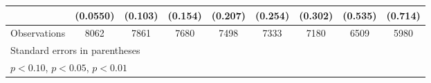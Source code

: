 \begin{table}[htbp]
\begin{tabular}{l*{8}{c}}
                    &    (0.0550)         &     (0.103)         &     (0.154)         &     (0.207)         &     (0.254)         &     (0.302)         &     (0.535)         &     (0.714)         \\
\hline
Observations        &        8062         &        7861         &        7680         &        7498         &        7333         &        7180         &        6509         &        5980         \\
\hline\hline
\multicolumn{9}{l}{\footnotesize Standard errors in parentheses}\\
\multicolumn{9}{l}{\footnotesize \sym{*} \(p<0.10\), \sym{**} \(p<0.05\), \sym{***} \(p<0.01\)}\\
\end{tabular}
\end{table}
